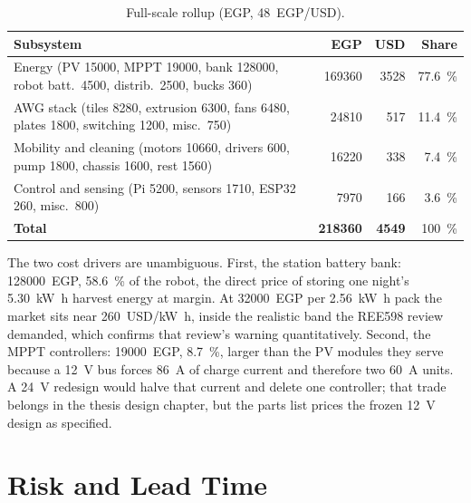\documentclass[11pt,a4paper]{article}
\begin{document}
\begin{table}[h]
\centering
\caption{Full-scale rollup (EGP, 48~EGP/USD).}
\label{tab:full}
\begin{tabular}{@{}p{9.6cm}rrr@{}}
\toprule
\textbf{Subsystem} & \textbf{EGP} & \textbf{USD} & \textbf{Share}\\
\midrule
Energy (PV 15000, MPPT 19000, bank 128000, robot batt.\ 4500,
  distrib.\ 2500, bucks 360) & \num{169360} & \num{3528} & \SI{77.6}{\percent}\\
AWG stack (tiles 8280, extrusion 6300, fans 6480, plates 1800,
  switching 1200, misc.\ 750) & \num{24810} & \num{517} & \SI{11.4}{\percent}\\
Mobility and cleaning (motors 10660, drivers 600, pump 1800,
  chassis 1600, rest 1560) & \num{16220} & \num{338} & \SI{7.4}{\percent}\\
Control and sensing (Pi 5200, sensors 1710, ESP32 260, misc.\ 800)
  & \num{7970} & \num{166} & \SI{3.6}{\percent}\\
\midrule
\textbf{Total} & \textbf{\num{218360}} & \textbf{\num{4549}} &
  \SI{100}{\percent}\\
\bottomrule
\end{tabular}
\end{table}

The two cost drivers are unambiguous. First, the station battery bank:
\num{128000}~EGP, \SI{58.6}{\percent} of the robot, the direct price of
storing one night's \SI{5.30}{\kilo\watt\hour} harvest energy at margin. At
\num{32000}~EGP per \SI{2.56}{\kilo\watt\hour} pack the market sits near
\num{260}~USD/\si{\kilo\watt\hour}, inside the realistic band the REE598
review demanded, which confirms that review's warning quantitatively. Second,
the MPPT controllers: \num{19000}~EGP, \SI{8.7}{\percent}, larger than the PV
modules they serve because a \SI{12}{\volt} bus forces \SI{86}{\ampere} of
charge current and therefore two \SI{60}{\ampere} units. A \SI{24}{\volt}
redesign would halve that current and delete one controller; that trade
belongs in the thesis design chapter, but the parts list prices the frozen
\SI{12}{\volt} design as specified.

\section{Risk and Lead Time}
\label{sec:risk}
\end{document}
